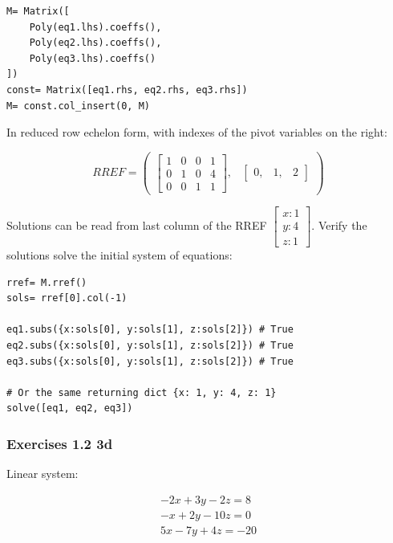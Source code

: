 \documentclass[a4paper]{article}
\begin{document}
\begin{verbatim}
M= Matrix([
    Poly(eq1.lhs).coeffs(),
    Poly(eq2.lhs).coeffs(),
    Poly(eq3.lhs).coeffs()
])
const= Matrix([eq1.rhs, eq2.rhs, eq3.rhs])
M= const.col_insert(0, M)
\end{verbatim}

In reduced row echelon form, with indexes of the pivot variables on the right:

\begin{equation}
RREF= \begin{pmatrix}\left[\begin{matrix}1 & 0 & 0 & 1\\0 & 1 & 0 & 4\\0 & 0 & 1 & 1\end{matrix}\right], & \begin{bmatrix}0, & 1, & 2\end{bmatrix}\end{pmatrix}
\end{equation}

Solutions can be read from last column of the RREF $\left[\begin{matrix}x:1\\y:4\\z:1\end{matrix}\right]$. Verify the solutions solve
the initial system of equations:

\begin{verbatim}
rref= M.rref()
sols= rref[0].col(-1)

eq1.subs({x:sols[0], y:sols[1], z:sols[2]}) # True
eq2.subs({x:sols[0], y:sols[1], z:sols[2]}) # True
eq3.subs({x:sols[0], y:sols[1], z:sols[2]}) # True

# Or the same returning dict {x: 1, y: 4, z: 1}
solve([eq1, eq2, eq3]) 
\end{verbatim}

\subsubsection{Exercises 1.2 3d}

Linear system:

\begin{equation}
\begin{matrix}
    - 2 x + 3 y - 2 z = 8 \\
    - x + 2 y - 10 z = 0 \\
    5 x - 7 y + 4 z = -20
\end{matrix}
\end{equation}
\end{document}
